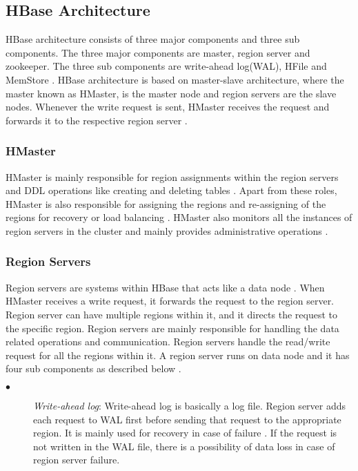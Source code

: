 \documentclass[11pt,a4paper,bibtotoc,idxtotoc,headsepline,footsepline,footexclude,BCOR12mm,DIV13]{scrbook}
\begin{document}

\newpage
\subsection{HBase Architecture}
\label{HBase Architecture}

HBase architecture consists of three major components and three sub components. The three major components are master, region server and zookeeper. The three sub components are write-ahead log(WAL), HFile and MemStore \cite{hbase:insights}. HBase architecture is based on master-slave architecture, where the master known as HMaster, is the master node and region servers are the slave nodes. Whenever the write request is sent, HMaster receives the request and forwards it to the respective region server \cite{hbase:insights}. 

\subsubsection{HMaster}
\label{hmaster}

HMaster is mainly responsible for region assignments within the region servers and DDL operations like creating and deleting tables \cite{hbase:architecture}. Apart from these roles, HMaster is also responsible for assigning the regions and re-assigning of the regions for recovery or load balancing \cite{hbase:architecture}. HMaster also monitors all the instances of region servers in the cluster and mainly provides administrative operations \cite{hbase:architecture}.

\subsubsection{Region Servers}
\label{region serves}

Region servers are systems within HBase that acts like a data node \cite{hbase:insights}. When HMaster receives a write request, it forwards the request to the region server. Region server can have multiple regions within it, and it directs the request to the specific region. Region servers are mainly responsible for handling the data related operations and communication. Region servers handle the read/write request for all the regions within it. 
A region server runs on data node and it has four sub components as described below \cite{hbase:architecture}.
\begin{description}
	\item[$\bullet$]  \emph{Write-ahead log}: Write-ahead log is basically a log file. Region server adds each request to WAL first before sending that request to the appropriate region. It is mainly used for recovery in case of failure \cite{hbase:insights}. If the request is not written in the WAL file, there is a possibility of data loss in case of region server failure.
\end{description}
\end{document}
